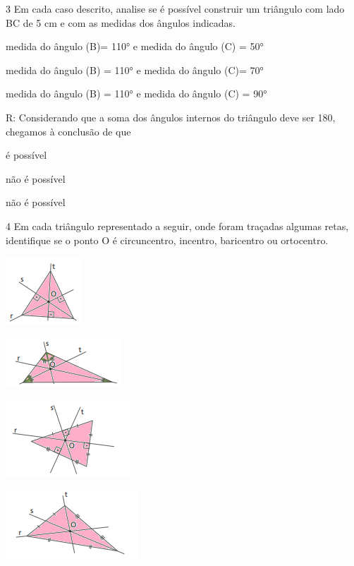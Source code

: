 {\num{3} Em cada caso descrito, analise se é possível construir um triângulo
com lado BC de 5 cm e com as medidas dos ângulos indicadas.
\item medida do ângulo (B)= 110° e medida do ângulo (C) = 50°
\item medida do ângulo (B) = 110° e medida do ângulo (C)= 70°
\item medida do ângulo (B) = 110° e medida do ângulo (C) = 90°

R: Considerando que a soma dos ângulos internos do triângulo deve ser 180,
chegamos à conclusão de que
\item é possível
\item não é possível
\item não é possível

\num{4} Em cada triângulo representado a seguir, onde foram traçadas algumas
retas, identifique se o ponto O é circuncentro, incentro, baricentro ou
ortocentro.
\item
\includegraphics[width=1.14583in,height=1.01042in]{./imgSAEB_8_MAT/media/image15.png}
\item
\includegraphics[width=1.72917in,height=0.71875in]{./imgSAEB_8_MAT/media/image16.png}
\item
\includegraphics[width=1.84375in,height=1.125in]{./imgSAEB_8_MAT/media/image17.png}
\item
\includegraphics[width=1.9375in,height=1.04167in]{./imgSAEB_8_MAT/media/image18.png}

}
